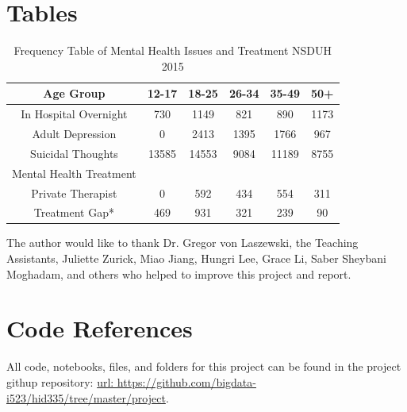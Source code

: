 \documentclass[sigconf]{acmart}
\begin{document}
\section{Tables}


\begin{table}
  \caption{Frequency Table of Mental Health Issues and Treatment NSDUH 2015
  \cite{samhsa16}}
  \label{tab:freq}
  \begin{tabular}{cccccc}
    \toprule
    Age Group & 12-17& 18-25& 26-34& 35-49& 50+\\
    \midrule
    In Hospital Overnight& 730& 1149& 821& 890& 1173 \\
    Adult Depression& 0& 2413& 1395& 1766& 967 \\
    Suicidal Thoughts& 13585& 14553& 9084& 11189& 8755 \\
    \midrule
    Mental Health Treatment& & & & & \\
    \midrule
    Private Therapist& 0& 592& 434& 554& 311 \\
    Treatment Gap*& 469& 931& 321& 239& 90 \\
    \bottomrule
  \end{tabular}
\end{table}



\begin{acks}

The author would like to thank Dr. Gregor von Laszewski, the Teaching 
Assistants, Juliette Zurick, Miao Jiang, Hungri Lee, Grace Li, Saber Sheybani
Moghadam, and others who helped to improve this project and report.

\end{acks}


 


\appendix



\section{Code References}

All code, notebooks, files, and folders for this project can be found in the
project githup repository: \url{url:  https://github.com/bigdata-i523/hid335/tree/master/project}.
\end{document}
